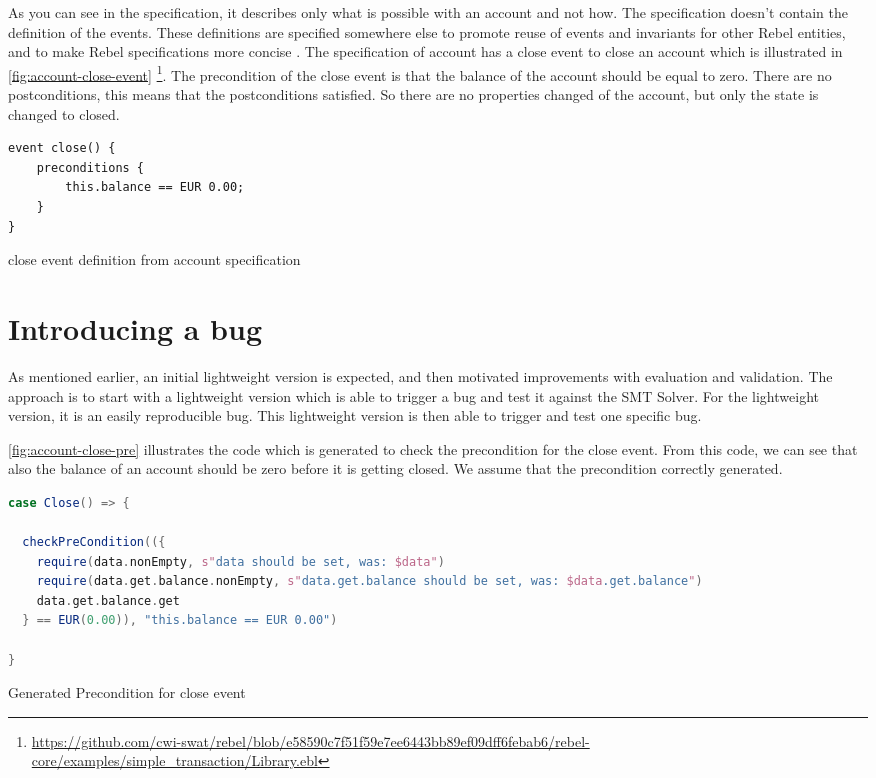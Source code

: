 As you can see in the specification, it describes only what is possible with an account and not how. The specification doesn't contain the definition of the events. These definitions are specified somewhere else to promote reuse of events and invariants for other Rebel entities, and to make Rebel specifications more concise \cite[p.4]{stoel_storm_vinju_bosman_2016}.
The specification of account has a close event to close an account which is illustrated in \autoref{fig:account-close-event} \footnote{\url{https://github.com/cwi-swat/rebel/blob/e58590c7f51f59e7ee6443bb89ef09dff6febab6/rebel-core/examples/simple_transaction/Library.ebl}}. The precondition of the close event is that the balance of the account should be equal to zero. There are no postconditions, this means that the postconditions satisfied. So there are no properties changed of the account, but only the state is changed to closed.

\begin{sourcecode}[h!]
\begin{lstlisting}[]
event close() { 
	preconditions {
		this.balance == EUR 0.00;
	}
}
\end{lstlisting}
\caption{close event definition from account specification}
\label{fig:account-close-event}
\end{sourcecode}

\section{Introducing a bug}

As mentioned earlier, an initial lightweight version is expected, and then motivated improvements with evaluation and validation. The approach is to start with a lightweight version which is able to trigger a bug and test it against the SMT Solver. For the lightweight version, it is an easily reproducible bug. This lightweight version is then able to trigger and test one specific bug.

\autoref{fig:account-close-pre} illustrates the code which is generated to check the precondition for the close event. From this code, we can see that also the balance of an account should be zero before it is getting closed. We assume that the precondition correctly generated.

\begin{sourcecode}[h!]
\begin{lstlisting}[language=scala]
case Close() => {

  checkPreCondition(({
    require(data.nonEmpty, s"data should be set, was: $data")
    require(data.get.balance.nonEmpty, s"data.get.balance should be set, was: $data.get.balance")
    data.get.balance.get
  } == EUR(0.00)), "this.balance == EUR 0.00")

}
\end{lstlisting}
\caption{Generated Precondition for close event}
\label{fig:account-close-pre}
\end{sourcecode}

